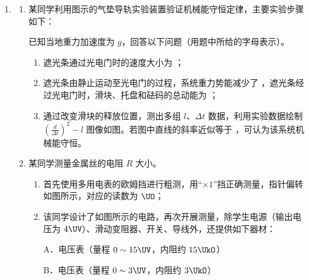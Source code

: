 \documentclass[\gkver]{gaokaozhenti}
\begin{document}
\begin{enumerate}
\item
\begin{enumerate}
	\item
	某同学利用图示的气垫导轨实验装置验证机械能守恒定律，主要实验步骤如下：
	已知当地重力加速度为 $g$，回答以下问题（用题中所给的字母表示）。
	\begin{enumerate}
		\item
		遮光条通过光电门时的速度大小为 ；
		\item
		遮光条由静止运动至光电门的过程，系统重力势能减少了 ，遮光条经过光电门时，滑块、托盘和砝码的总动能为 ；
		\item
		通过改变滑块的释放位置，测出多组 $l$、$\Delta t$ 数据，利用实验数据绘制 $\left(\frac{d}{\Delta t}\right)^{2}-l$ 图像如图。若图中直线的斜率近似等于 ，可认为该系统机械能守恒。
	\end{enumerate}
	\item
	某同学测量金属丝的电阻 $R$ 大小。
	\begin{enumerate}
		\item
		首先使用多用电表的欧姆挡进行粗测，用“$\times 1$”挡正确测量，指针偏转如图所示，对应的读数为 $\UO$；
		\item
		该同学设计了如图所示的电路，再次开展测量，除学生电源（输出电压为 $4 \UV$）、滑动变阻器、开关、导线外，还提供如下器材：

		A．电压表（量程 $0 \sim 15 \UV$，内阻约 $15 \UkO$）

		B．电压表（量程 $0 \sim 3 \UV$，内阻约 $3 \UkO$）


\end{enumerate}
\end{enumerate}
\end{enumerate}
\end{document}
